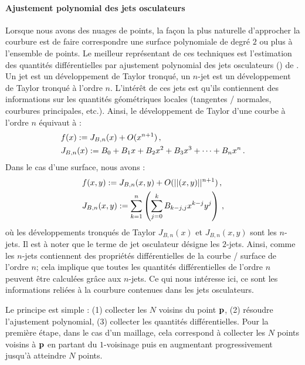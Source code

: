 \paragraph{Ajustement polynomial des jets osculateurs}
%
Lorsque nous avons des nuages de points, la façon la plus naturelle d'approcher
la courbure est de faire correspondre une surface polynomiale de degré $2$ ou
plus à l'ensemble de points. Le meilleur représentant de ces techniques est
l'estimation des quantités différentielles par ajustement polynomial des jets
osculateurs () de . Un jet
est un développement de Taylor tronqué, un $n$-jet est un développement de
Taylor tronqué à l'ordre $n$. L'intérêt de ces jets est qu'ils contiennent des
informations sur les quantités géométriques locales (tangentes / normales,
courbures principales, etc.).
%
%
Ainsi, le développement de Taylor d'une courbe à l'ordre $n$ équivaut à :
%
\begin{align}
  &f(x) := J_{B,n}(x) + O(x^{n+1}) \,, \\
  &J_{B,n}(x) := B_0 + B_1x + B_2x^2 + B_3x^3 + \cdots + B_nx^n \,.
\end{align}
%
Dans le cas d'une surface, nous avons :
%
\begin{align}
  &f(x,y) := J_{B,n}(x,y) + O(||(x,y)||^{n+1}) \,, \\
  &J_{B,n}(x,y) := \sum_{k=1}^{n} \left( \sum_{j=0}^{k} B_{k-j,j}x^{k-j}y^j \right) \,,
\end{align}
%
où les développements tronqués de Taylor $J_{B,n}(x)$ et $J_{B,n}(x,y)$ sont les
$n$-jets. Il est à noter que le terme de jet osculateur désigne les $2$-jets.
Ainsi, comme les $n$-jets contiennent des propriétés différentielles de la
courbe / surface de l'ordre $n$; cela implique que toutes les quantités
différentielles de l'ordre $n$ peuvent être calculées grâce aux $n$-jets. Ce qui
nous intéresse ici, ce sont les informations reliées à la courbure contenues
dans les jets osculateurs.


Le principe est simple : (1) collecter les $N$ voisins du point $\mathbf{p}$, (2)
résoudre l'ajustement polynomial, (3) collecter les quantités différentielles.
%
%
Pour la première étape, dans le cas d'un maillage, cela correspond à collecter
les $N$ points voisins à $\mathbf{p}$ en partant du $1$-voisinage puis en augmentant
progressivement jusqu'à atteindre $N$ points.
%


